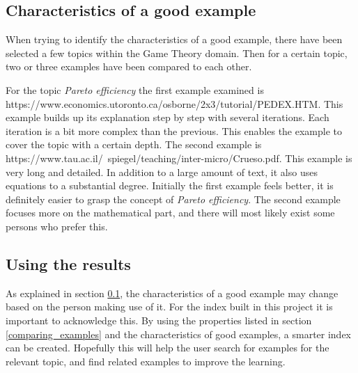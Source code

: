 \subsection{Characteristics of a good example} \label{good_example}

When trying to identify the characteristics of a good example, there have been selected a few topics within the Game Theory domain. Then for a certain topic, two or three examples have been compared to each other.  

For the topic \textit{Pareto efficiency} the first example examined is\\ https://www.economics.utoronto.ca/osborne/2x3/tutorial/PEDEX.HTM. This example builds up its explanation step by step with several iterations. Each iteration is a bit more complex than the previous. This enables the example to cover the topic with a certain depth. The second example is https://www.tau.ac.il/~spiegel/teaching/inter-micro/Crueso.pdf. This example is very long and detailed. In addition to a large amount of text, it also uses equations to a substantial degree. Initially the first example feels better, it is definitely easier to grasp the concept of \textit{Pareto efficiency}. The second example focuses more on the mathematical part, and there will most likely exist some persons who prefer this. 

\subsection{Using the results}

As explained in section \ref{good_example}, the characteristics of a good example may change based on the person making use of it. For the index built in this project it is important to acknowledge this. By using the properties listed in section \ref{comparing_examples} and the characteristics of good examples, a smarter index can be created. Hopefully this will help the user search for examples for the relevant topic, and find related examples to improve the learning.

\cleardoublepage